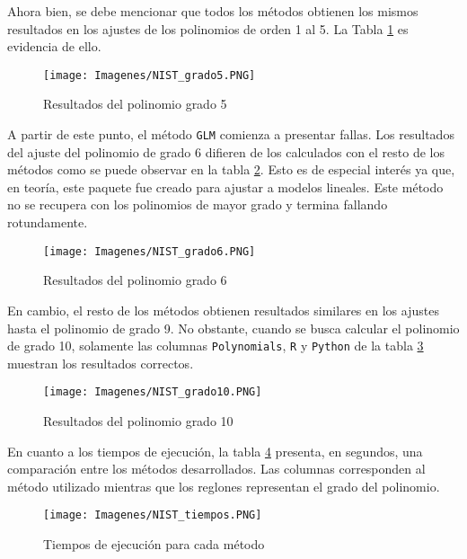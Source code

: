 Ahora bien, se debe mencionar que todos los métodos obtienen los mismos resultados en los ajustes de los polinomios de orden 1 al 5. La Tabla \ref{NIST_res_gr5} es evidencia de ello. 

\begin{figure}[h]
	\begin{center}
		\texttt{[image: Imagenes/NIST\_grado5.PNG]}
		\caption{Resultados del polinomio grado 5}
		\label{NIST_res_gr5}
	\end{center}
\end{figure}

A partir de este punto, el método \texttt{GLM} comienza a presentar fallas. Los resultados del ajuste del polinomio de grado 6 difieren de los calculados con el resto de los métodos como se puede observar en la tabla \ref{NIST_res_gr6}. Esto es de especial interés ya que, en teoría, este paquete fue creado para ajustar a modelos lineales. Este método no se recupera con los polinomios de mayor grado y termina fallando rotundamente.


\begin{figure}[h]
\begin{center}
\texttt{[image: Imagenes/NIST\_grado6.PNG]}
\caption{Resultados del polinomio grado 6}
\label{NIST_res_gr6}
\end{center}
\end{figure}

En cambio, el resto de los métodos obtienen resultados similares en los ajustes hasta el polinomio de grado 9. No obstante, cuando se busca calcular el polinomio de grado 10, solamente las columnas \texttt{Polynomials}, \texttt{R} y \texttt{Python} de la tabla \ref{NIST_res_gr10} muestran los resultados correctos. 

\begin{figure}[h]
\begin{center}
\texttt{[image: Imagenes/NIST\_grado10.PNG]}
\caption{Resultados del polinomio grado 10}
\label{NIST_res_gr10}
\end{center}
\end{figure}

En cuanto a los tiempos de ejecución, la tabla \ref{NIST_tiempos} presenta, en segundos, una comparación entre los métodos desarrollados. Las columnas corresponden al método utilizado mientras que los reglones representan el grado del polinomio. 


\begin{figure}[h]
\begin{center}
\texttt{[image: Imagenes/NIST\_tiempos.PNG]}
\caption{Tiempos de ejecución para cada método}
\label{NIST_tiempos}
\end{center}
\end{figure}

